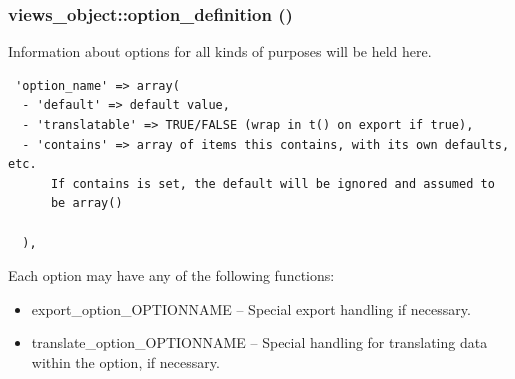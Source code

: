 {\subsubsection[{option\_\-definition}]{\setlength{\rightskip}{0pt plus 5cm}views\_\-object::option\_\-definition ()}}
\label{classviews__object_b0753d0001c8c9ff98beee696b4516ba}


Information about options for all kinds of purposes will be held here. 

\begin{Code}\begin{verbatim} 'option_name' => array(
  - 'default' => default value,
  - 'translatable' => TRUE/FALSE (wrap in t() on export if true),
  - 'contains' => array of items this contains, with its own defaults, etc.
      If contains is set, the default will be ignored and assumed to
      be array()

  ),
\end{verbatim}
\end{Code}

 Each option may have any of the following functions:\begin{itemize}
\item export\_\-option\_\-OPTIONNAME -- Special export handling if necessary.\item translate\_\-option\_\-OPTIONNAME -- Special handling for translating data within the option, if necessary. \end{itemize}


